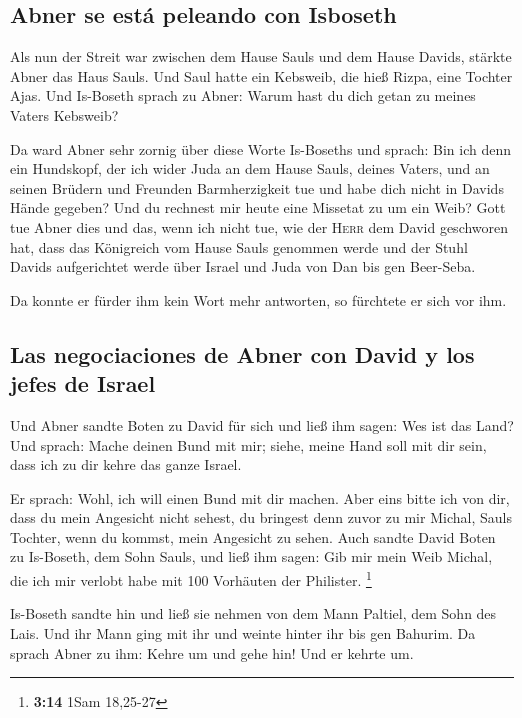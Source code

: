 \hypertarget{abner-se-estuxe1-peleando-con-isboseth}{%
\subsection{Abner se está peleando con
Isboseth}\label{abner-se-estuxe1-peleando-con-isboseth}}

 Als nun der Streit war zwischen dem Hause Sauls und dem
Hause Davids, stärkte Abner das Haus Sauls.  Und Saul
hatte ein Kebsweib, die hieß Rizpa, eine Tochter Ajas. Und Is-Boseth
sprach zu Abner: Warum hast du dich getan zu meines Vaters Kebsweib?

 Da ward Abner sehr zornig über diese Worte Is-Boseths und
sprach: Bin ich denn ein Hundskopf, der ich wider Juda an dem Hause
Sauls, deines Vaters, und an seinen Brüdern und Freunden Barmherzigkeit
tue und habe dich nicht in Davids Hände gegeben? Und du rechnest mir
heute eine Missetat zu um ein Weib?  Gott tue Abner dies
und das, wenn ich nicht tue, wie der \textsc{Herr} dem David geschworen
hat,  dass das Königreich vom Hause Sauls genommen werde
und der Stuhl Davids aufgerichtet werde über Israel und Juda von Dan bis
gen Beer-Seba.

 Da konnte er fürder ihm kein Wort mehr antworten, so
fürchtete er sich vor ihm.

\hypertarget{las-negociaciones-de-abner-con-david-y-los-jefes-de-israel}{%
\subsection{Las negociaciones de Abner con David y los jefes de
Israel}\label{las-negociaciones-de-abner-con-david-y-los-jefes-de-israel}}

 Und Abner sandte Boten zu David für sich und ließ ihm
sagen: Wes ist das Land? Und sprach: Mache deinen Bund mit mir; siehe,
meine Hand soll mit dir sein, dass ich zu dir kehre das ganze Israel.

 Er sprach: Wohl, ich will einen Bund mit dir machen.
Aber eins bitte ich von dir, dass du mein Angesicht nicht sehest, du
bringest denn zuvor zu mir Michal, Sauls Tochter, wenn du kommst, mein
Angesicht zu sehen.  Auch sandte David Boten zu
Is-Boseth, dem Sohn Sauls, und ließ ihm sagen: Gib mir mein Weib Michal,
die ich mir verlobt habe mit 100 Vorhäuten der Philister. \footnote{\textbf{3:14}
  1Sam 18,25-27}

 Is-Boseth sandte hin und ließ sie nehmen von dem Mann
Paltiel, dem Sohn des Lais.  Und ihr Mann ging mit ihr
und weinte hinter ihr bis gen Bahurim. Da sprach Abner zu ihm: Kehre um
und gehe hin! Und er kehrte um.

